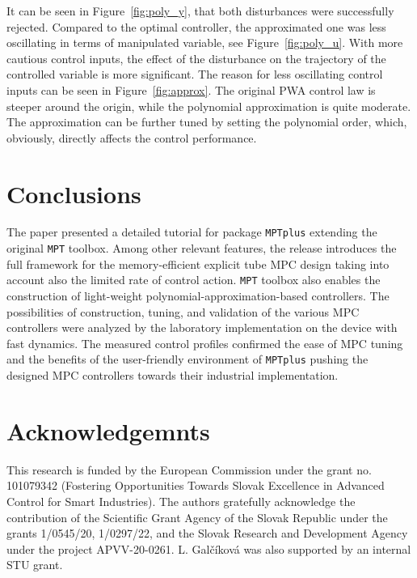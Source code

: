 \documentclass[letterpaper, 10 pt, conference]{ieeeconf}
\begin{document}
	It can be seen in Figure~\ref{fig:poly_y}, that both disturbances were successfully rejected. Compared to the optimal controller, the approximated one was less oscillating in terms of manipulated variable, see Figure~\ref{fig:poly_u}. With more cautious control inputs, the effect of the disturbance on the trajectory of the controlled variable is more significant. The reason for less oscillating control inputs can be seen in Figure~\ref{fig:approx}. The original PWA control law is steeper around the origin, while the polynomial approximation is quite moderate. The approximation can be further tuned by setting the polynomial order, which, obviously, directly affects the control performance.
	
	
	\section{Conclusions}
	\label{sec:conclusions}
	
	The paper presented a detailed tutorial for package \texttt{MPTplus} extending the original \texttt{MPT} toolbox. Among other relevant features, the release introduces the full framework for the memory-efficient explicit tube MPC design taking into account also the limited rate of control action. \texttt{MPT} toolbox also enables the construction of light-weight polynomial-approximation-based controllers. The possibilities of construction, tuning, and validation of the various MPC controllers were analyzed by the laboratory implementation on the device with fast dynamics. The measured control profiles confirmed the ease of MPC tuning and the benefits of the user-friendly environment of \texttt{MPTplus} pushing the designed MPC controllers towards their industrial implementation.
	
	\addtolength{\textheight}{-12cm}
	
	\section*{Acknowledgemnts}
	
	\small{
		This research is funded by the European Commission under the grant no. 101079342 (Fostering Opportunities Towards Slovak Excellence in Advanced Control for Smart Industries). The authors gratefully acknowledge the contribution of the Scientific Grant Agency of the Slovak Republic under the grants 1/0545/20, 1/0297/22, and the Slovak Research and Development Agency under the project APVV-20-0261. L. Galčíková was also supported by an internal STU grant. 
	}
	
	
	
	
	
\end{document}
